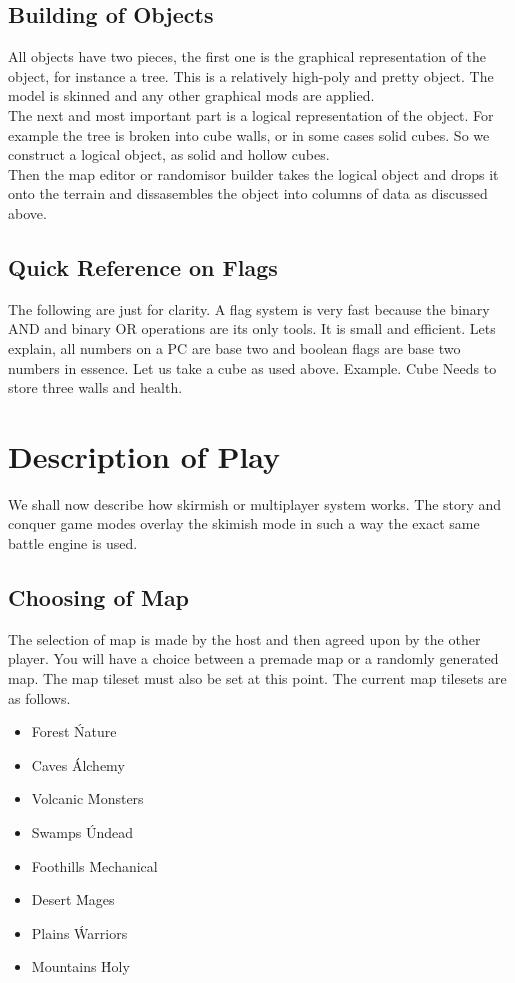 \documentclass[a4paper,twocolumn]{article}
\begin{document}
\subsection{Building of Objects}

All objects have two pieces, the first one is the graphical representation of the object, for instance a tree. This is a relatively high-poly and pretty object. The model is skinned and any other graphical mods are applied.\\
The next and most important part is a logical representation of the object. For example the tree is broken into cube walls, or in some cases solid cubes. So we construct a logical object, as solid and hollow cubes.\\
Then the map editor or randomisor builder takes the logical object and drops it onto the terrain and dissasembles the object into columns of data as discussed above.

\subsection{Quick Reference on Flags}

The following are just for clarity. A flag system is very fast because the binary AND and binary OR operations are its only tools. It is small and efficient. Lets explain, all numbers on a PC are base two and boolean flags are base two numbers in essence. Let us take a cube as used above. Example.
Cube Needs to store three walls and health. 

\newpage \section{Description of Play}

We shall now describe how skirmish or multiplayer system works. The story and conquer game modes overlay the skimish mode in such a way the exact same battle engine is used.

\subsection{Choosing of Map}

The selection of map is made by the host and then agreed upon by the other player. You will have a choice between a premade map or a randomly generated map. The map tileset must also be set at this point. The current map tilesets are as follows.

\begin{itemize}
\item Forest		\' Nature
\item Caves			\' Alchemy
\item Volcanic		\' Monsters
\item Swamps		\' Undead
\item Foothills		\' Mechanical
\item Desert		\' Mages
\item Plains		\' Warriors
\item Mountains		\' Holy
\end{itemize}
\end{document}
